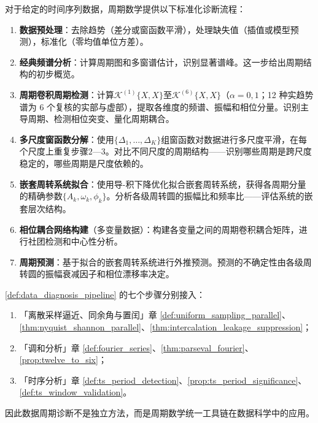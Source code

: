 \begin{definition}[数据周期诊断流程]\label{def:data_diagnosis_pipeline}
对于给定的时间序列数据，周期数学提供以下标准化诊断流程：
\begin{enumerate}[label=(\roman*)]
    \item \textbf{数据预处理}：去除趋势（差分或窗函数平滑），处理缺失值（插值或模型预测），标准化（零均值单位方差）。
    \item \textbf{经典频谱分析}：计算周期图和多窗谱估计，识别显著谱峰。这一步给出周期结构的初步概览。
    \item \textbf{周期卷积周期检测}：计算$\mathcal{K}^{(1)}\{X, X\}$至$\mathcal{K}^{(6)}\{X, X\}$（$\alpha=0,1$；12 种实趋势谱为 6 个复核的实部与虚部），提取各维度的频谱、振幅和相位分量。识别主导周期、检测相位突变、量化周期耦合。
    \item \textbf{多尺度窗函数分解}：使用$\{\Delta_1, \dots, \Delta_K\}$组窗函数对数据进行多尺度平滑，在每个尺度上重复步骤$2$—$3$。对比不同尺度的周期结构——识别哪些周期是跨尺度稳定的，哪些周期是尺度依赖的。
    \item \textbf{嵌套周转系统拟合}：使用导-积下降优化拟合嵌套周转系统，获得各周期分量的精确参数$\{A_k, \omega_k, \phi_k\}$。分析各级周转圆的振幅比和频率比——评估系统的嵌套层次结构。
    \item \textbf{相位耦合网络构建}（多变量数据）：构建各变量之间的周期卷积耦合矩阵，进行社团检测和中心性分析。
    \item \textbf{周期预测}：基于拟合的嵌套周转系统进行外推预测。预测的不确定性由各级周转圆的振幅衰减因子和相位漂移率决定。
\end{enumerate}
\end{definition}

\begin{theorem}[数据周期诊断流程与三章接口]\label{thm:data_diagnosis_integration}
\cref{def:data_diagnosis_pipeline} 的七个步骤分别接入：
\begin{enumerate}[label=(\roman*)]
    \item 「离散采样逼近、同余角与置闰」章 \cref{def:uniform_sampling_parallel}、\cref{thm:nyquist_shannon_parallel}、\cref{thm:intercalation_leakage_suppression}；
    \item 「调和分析」章 \cref{def:fourier_series}、\cref{thm:parseval_fourier}、\cref{prop:twelve_to_six}；
    \item 「时序分析」章 \cref{def:ts_period_detection}、\cref{prop:ts_period_significance}、\cref{def:ts_window_validation}。
\end{enumerate}
因此数据周期诊断不是独立方法，而是周期数学统一工具链在数据科学中的应用。
\end{theorem}


